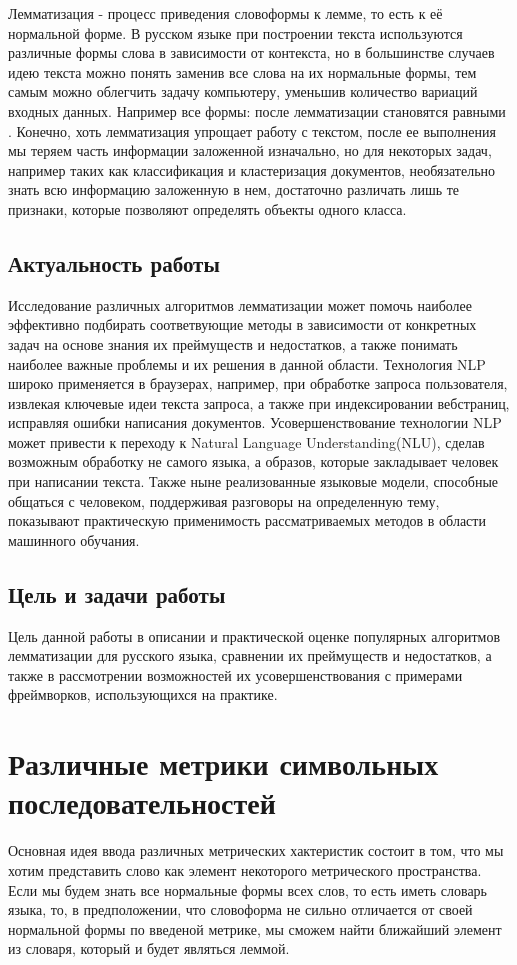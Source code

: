 \documentclass[12pt, a4paper]{article}
\begin{document}
Лемматизация - процесс приведения словоформы к лемме, то есть к её нормальной форме. В русском языке при построении текста используются различные формы слова в зависимости от контекста, но в большинстве случаев идею текста можно понять заменив все слова на их нормальные формы, тем самым можно облегчить задачу компьютеру, уменьшив количество вариаций входных данных. Например все формы:  после лемматизации становятся равными . Конечно, хоть лемматизация упрощает работу с текстом, после ее выполнения мы теряем часть информации заложенной изначально, но для некоторых задач, например таких как классификация и кластеризация документов, необязательно знать всю информацию заложенную в нем, достаточно различать лишь те признаки, которые позволяют определять объекты одного класса.

\subsection{Актуальность работы}
\quad Исследование различных алгоритмов лемматизации может помочь наиболее эффективно подбирать соответвующие методы в зависимости от конкретных задач на основе знания их преймуществ и недостатков, а также понимать наиболее важные проблемы и их решения в данной области. Технология NLP широко применяется в браузерах, например, при обработке запроса пользователя, извлекая ключевые идеи текста запроса, а также при индексировании вебстраниц, исправляя ошибки написания документов. Усовершенствование технологии NLP может привести к переходу к Natural Language Understanding(NLU), сделав возможным обработку не самого языка, а образов, которые закладывает человек при написании текста. 
Также ныне реализованные языковые модели, способные общаться с человеком, поддерживая разговоры на определенную тему, показывают практическую применимость рассматриваемых методов в области машинного обучания.

\subsection{Цель и задачи работы}
\quad Цель данной работы в описании и практической оценке популярных алгоритмов лемматизации для русского языка, сравнении их преймуществ и недостатков, а также в рассмотрении возможностей их усовершенствования с примерами фреймворков, использующихся на практике.

\section{Различные метрики символьных последовательностей}
\quad Основная идея ввода различных метрических хактеристик состоит в том, что мы хотим представить слово как элемент некоторого метрического пространства. Если мы будем знать все нормальные формы всех слов, то есть иметь словарь языка, то, в предположении, что словоформа не сильно отличается от своей нормальной формы по введеной метрике, мы сможем найти ближайший элемент из словаря, который и будет являться леммой.
\end{document}
